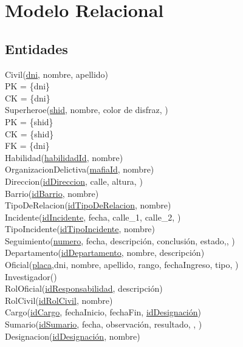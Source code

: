 \documentclass[a4paper,10pt]{article}
\title{}
\author{}
\begin{document}
\maketitle
\section{Modelo Relacional}\label{modelo-relacional}

\subsection{Entidades}\label{entidades}

Civil(\uline{dni}, nombre, apellido)\\
PK = \{dni\}\\
CK = \{dni\}\\
Superheroe(\uline{shid}, nombre, color de disfraz, )\\
PK = \{shid\}\\
CK = \{shid\}\\
FK = \{dni\}\\

Habilidad(\uline{habilidadId}, nombre)\\
OrganizacionDelictiva(\uline{mafiaId}, nombre)\\
Direccion(\uline{idDireccion}, calle, altura, )\\
Barrio(\uline{idBarrio}, nombre)\\
TipoDeRelacion(\uline{idTipoDeRelacion}, nombre)\\
Incidente(\uline{idIncidente}, fecha, calle\_1, calle\_2,
)\\
TipoIncidente(\uline{idTipoIncidente}, nombre)\\
Seguimiento(\uline{numero}, fecha, descripción, conclusión,
estado,, )\\
Departamento(\uline{idDepartamento}, nombre, descripción)\\
Oficial(\uline{placa},dni, nombre, apellido, rango, fechaIngreso, tipo,
) \\
Investigador()\\
RolOficial(\uline{idResponsabilidad}, descripción)\\
RolCivil(\uline{idRolCivil}, nombre)\\
Cargo(\uline{idCargo}, fechaInicio, fechaFin, \uline{idDesignación})\\
Sumario(\uline{idSumario}, fecha, observación, resultado, ,
)\\
Designacion(\uline{idDesignación}, nombre) \\
\end{document}
